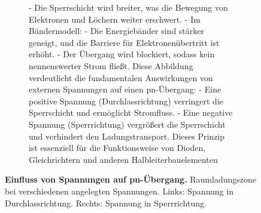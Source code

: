 {\begin{figure}[H]
\begin{minipage}[c]{0.48\textwidth}
\begin{figure}[H]
{                - Die Sperrschicht wird breiter, was die Bewegung von Elektronen und Löchern weiter erschwert.  
                - Im Bändermodell:   
                - Die Energiebänder sind stärker geneigt, und die Barriere für Elektronenübertritt ist erhöht.  
                - Der Übergang wird blockiert, sodass kein nennenswerter Strom fließt.  
                Diese Abbildung verdeutlicht die fundamentalen Auswirkungen von externen Spannungen auf einen pn-Übergang:  
                - Eine positive Spannung (Durchlassrichtung) verringert die Sperrschicht und ermöglicht Stromfluss.  
                - Eine negative Spannung (Sperrrichtung) vergrößert die Sperrschicht und verhindert den Ladungstransport.  
                Dieses Prinzip ist essenziell für die Funktionsweise von Dioden, Gleichrichtern und anderen Halbleiterbauelementen}
            \end{figure}
        \end{minipage}
        \caption{\textbf{Einfluss von Spannungen auf pn-Übergang.} Raumladungszone bei verschiedenen angelegten 
        Spannungen. Links: Spannung in Durchlassrichtung. Rechts: Spannung in Sperrrichtung.}  
        \label{fig:EinflussVonSpannungenAufPn-Uebergang}
    \end{figure}
}
%
%
